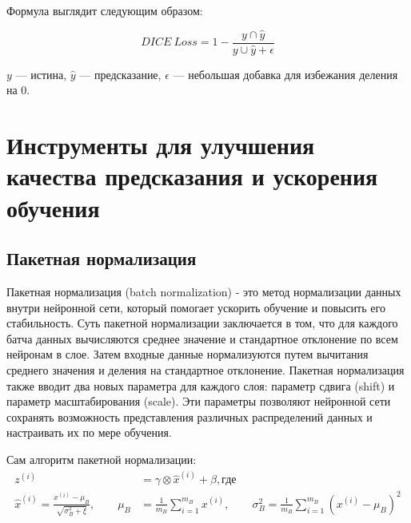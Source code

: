 Формула выглядит следующим образом:

\begin{equation}
	DICE \: Loss = 1 - \frac{y \cap \hat{y}}{y \cup \hat{y} + \epsilon}
\end{equation}

\noindent $y$ --- истина, $\hat{y}$ --- предсказание, $\epsilon$ --- небольшая
добавка для избежания деления на 0.

\section{Инструменты для улучшения качества предсказания и ускорения обучения}

\subsection{Пакетная нормализация}

Пакетная нормализация (batch normalization) - это метод нормализации данных
внутри нейронной сети, который помогает ускорить обучение и повысить его
стабильность. Суть пакетной нормализации заключается в том, что для каждого
батча данных вычисляются среднее значение и стандартное отклонение по всем
нейронам в слое. Затем входные данные нормализуются путем вычитания среднего
значения и деления на стандартное отклонение. Пакетная нормализация также
вводит два новых параметра для каждого слоя: параметр сдвига (shift) и параметр
масштабирования (scale). Эти параметры позволяют нейронной сети сохранять
возможность представления различных распределений данных и настраивать их по
мере обучения.

Сам алгоритм пакетной нормализации:
\begin{align*}
	z^{(i)} & = \gamma \otimes \hat x^{(i)} + \beta, \text{где}        \\
	\hat x^{(i)} = \frac{x^{(i)} - \mu_B}{\sqrt{\sigma^2_B + \xi}}, \qquad
	\mu_B   & = \frac{1}{m_B} \sum\limits_{i = 1}^{m_B}x^{(i)}, \qquad
	\sigma_B^2 = \frac{1}{m_B} \sum\limits_{i = 1}^{m_B}(x^{(i)} - \mu_B)^2
\end{align*}

